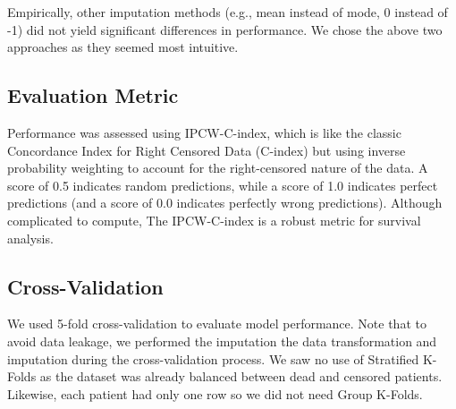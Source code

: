 \documentclass{article}
\begin{document}
Empirically, other imputation methods (e.g., mean instead of mode, 0 instead of -1) did not yield significant differences in performance. We chose the above two approaches as they seemed most intuitive.

\subsection{Evaluation Metric}
Performance was assessed using IPCW-C-index, which is like the classic Concordance Index for Right Censored Data (C-index) but using inverse probability weighting to account for the right-censored nature of the data. A score of 0.5 indicates random predictions, while a score of 1.0 indicates perfect predictions (and a score of 0.0 indicates perfectly wrong predictions). Although complicated to compute, The IPCW-C-index is a robust metric for survival analysis.

\subsection{Cross-Validation}
We used 5-fold cross-validation to evaluate model performance. Note that to avoid data leakage, we performed the imputation the data transformation and imputation during the cross-validation process. We saw no use of Stratified K-Folds as the dataset was already balanced between dead and censored patients. Likewise, each patient had only one row so we did not need Group K-Folds.
\end{document}

